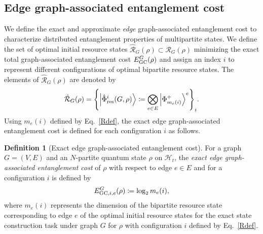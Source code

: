 \documentclass[preprintnumbers,aps,amsmath,amssymb,pra,twocolumn,showpacs,superscriptaddress,floatfix]{revtex4-1}
\def\Ket#1{\left|#1\right\rangle}
\theoremstyle{plain}
\theoremstyle{definition}
\newtheorem{definition}[theorem]{Definition}
\theoremstyle{remark}
\begin{document}
\subsection{Edge graph-associated entanglement cost}

We define the exact and approximate \textit{edge} graph-associated entanglement cost to characterize distributed entanglement properties of multipartite states.  We define the set of optimal initial resource states $\hat{\mathcal{R}}_G (\rho) \subset \mathcal{R}_G (\rho)$ minimizing the exact total graph-associated entanglement cost $E_{\textup{GC}}^G (\rho)$ and assign an index $i$ to represent different configurations of optimal bipartite resource states.   The elements of $\hat{\mathcal{R}}_G (\rho)$ are denoted by
\begin{align}
    \hat{\mathcal{R}}_G (\rho) = {\left\{ \Ket{\hat{\Phi}_{\textup{res}}^i (G,\rho) } \coloneqq \bigotimes_{e \in E} \Ket{\Phi_{m_e(i)}^+}^e\right\}}_i.  
\label{Rdef}
\end{align}
Using $m_e(i)$ defined by Eq.~\eqref{Rdef}, the exact edge graph-associated entanglement cost is defined for each configuration $i$ as follows.
\begin{definition}[Exact edge graph-associated entanglement cost]
    For a graph $G=(V,E)$ and an $N$-partite quantum state $\rho$ on $\mathcal{H}_t$, the \textit{exact edge graph-associated entanglement cost} of $\rho$ with respect to edge $e\in E$ and for a configuration $i$ is defined by
\begin{align*}
E_{\textup{GC},i,e}^G (\rho) \coloneqq \log_2 m_e (i),
\end{align*}
where $m_e (i)$ represents the dimension of the bipartite resource state corresponding to edge $e$ of the optimal initial resource states for the exact state construction task under graph $G$ for $\rho$ with configuration $i$ defined by Eq.~\eqref{Rdef}.
\end{definition}
\end{document}
